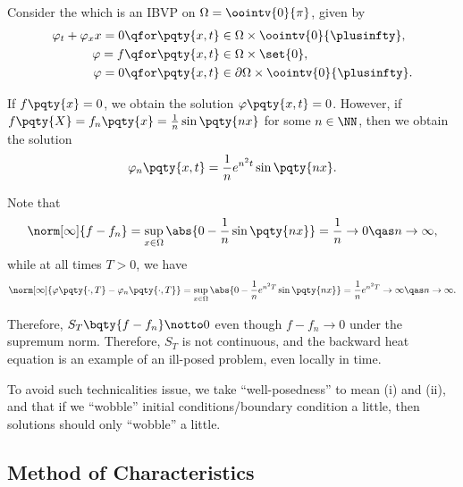 \begin{example}
    Consider the  which is an IBVP on \(\Omega = \oointv{0}{\pi}\), given by
    \begin{subequations}
        \begin{align}
            \varphi_t + \varphi_xx = 0 &\qfor \pqty{x, t} \in \Omega \times \oointv{0}{\plusinfty}, \\
            \varphi = f &\qfor \pqty{x, t} \in \Omega \times \set{0}, \\
            \varphi = 0 &\qfor \pqty{x, t} \in \partial \Omega \times \oointv{0}{\plusinfty}.
        \end{align}
    \end{subequations}

    If \(f\pqty{x} = 0\), we obtain the solution \(\varphi\pqty{x, t} = 0\). However, if \(f\pqty{X} = f_n\pqty{x} = \frac{1}{n} \sin\pqty{nx}\) for some \(n \in \NN\), then we obtain the solution
    \begin{equation}
        \varphi_n\pqty{x, t} = \frac{1}{n} e^{n^2 t} \sin\pqty{nx}.
    \end{equation}

    Note that
    \begin{equation}
        \norm[\infty]{f - f_n} = \sup_{x \in \Omega} \abs{0 - \frac{1}{n} \sin\pqty{n x}} = \frac{1}{n} \to 0 \qas n \to \infty,
    \end{equation}
    while at all times \(T > 0\), we have
    \begin{equation}
        \norm[\infty]{\varphi\pqty{\cdot, T} - \varphi_n\pqty{\cdot, T}} = \sup_{x \in \Omega} \abs{0 - \frac{1}{n} e^{n^2 T} \sin\pqty{nx}} = \frac{1}{n} e^{n^2 T} \to \infty \qas n \to \infty.
    \end{equation}

    Therefore, \(S_T \bqty{f - f_n} \notto 0\) even though \(f - f_n \to 0\) under the supremum norm. Therefore, \(S_T\) is not continuous, and the backward heat equation is an example of an ill-posed problem, even locally in time.
\end{example}

To avoid such technicalities issue, we take ``well-posedness'' to mean (i) and (ii), and that if we ``wobble'' initial conditions/boundary condition a little, then solutions should only ``wobble'' a little.

\subsection{Method of Characteristics}

